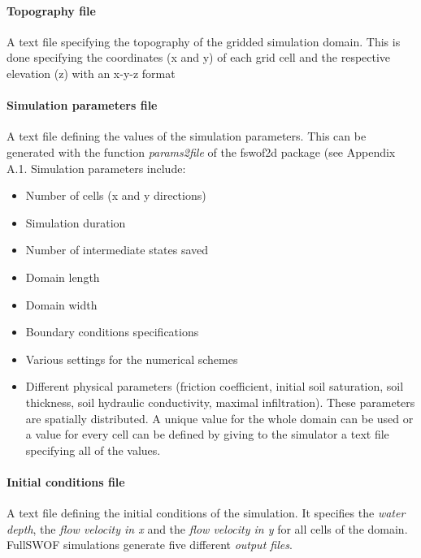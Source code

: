 \paragraph{Topography file} A text file specifying the topography of the gridded simulation domain. This is done specifying the coordinates (x and y) of each grid cell and the respective elevation (z) with an x-y-z format 

\paragraph{Simulation parameters file} A text file defining the values of the simulation parameters. This can be generated with the function \textit{params2file} of the fswof2d package (see Appendix A.1.
Simulation parameters include:

\begin{itemize}
\itemsep0em
  \item Number of cells (x and y directions)
  \item Simulation duration
  \item Number of intermediate states saved
  \item Domain length
  \item Domain width
  \item Boundary conditions specifications
  \item Various settings for the numerical schemes
  \item Different physical parameters (friction coefficient, initial soil saturation, soil thickness, soil hydraulic conductivity, maximal infiltration). These parameters are spatially distributed. A unique value for the whole domain can be used or a value for every cell can be defined by giving to the simulator a text file specifying all of the values.\\
\end{itemize}

\paragraph{Initial conditions file} A text file defining the initial conditions of the simulation. It specifies the \emph{water depth}, the \emph{flow velocity in x} and the \emph{flow velocity in y} for all cells of the domain. \\ %

FullSWOF simulations generate five different \emph{output files}.
